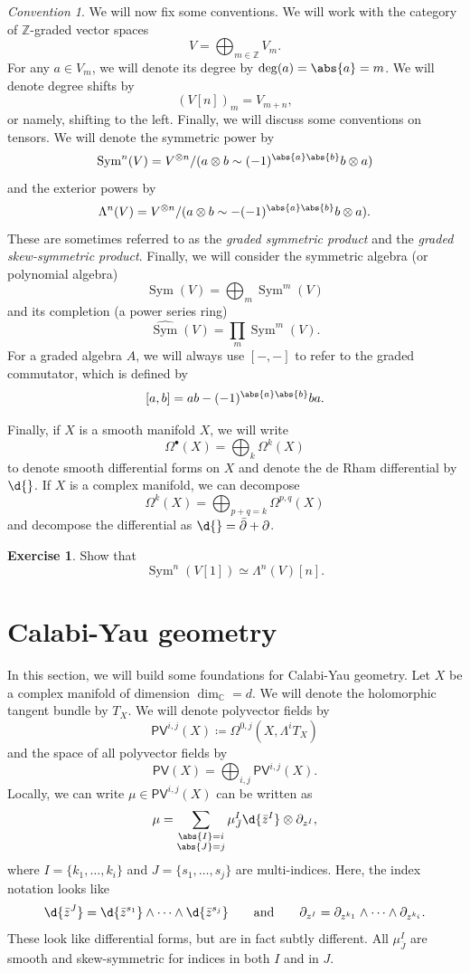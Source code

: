 \documentclass[article,10pt,oneside,oldfontcommands]{memoir}
\theoremstyle{definition}
\newtheorem{exer}[thm]{Exercise}
\theoremstyle{remark}
\newtheorem{conv}[thm]{Convention}
\theoremstyle{plain}
\theoremstyle{definition}
\theoremstyle{remark}
\newcommand{\C}{\mathbb{C}}
\newcommand{\Z}{\mathbb{Z}}
\newcommand{\on}[1]{\operatorname{#1}}
\newcommand{\ms}[1]{\mathsf{#1}}
\newcommand{\wh}[1]{\widehat{#1}}
\newcommand{\1}{\mathbf{1}}
\newcommand{\2}{\mathbf{2}}
\newcommand{\3}{\mathbf{3}}
\DeclareMathOperator{\Sym}{Sym}
\begin{document}
\begin{conv}
    We will now fix some conventions. We will work with the category of \(\Z\)-graded vector spaces
    \[ V = \bigoplus_{m \in \Z} V_m. \]
    For any \(a \in V_m\), we will denote its degree by \(\deg(a) = \abs{a} = m\). We will denote degree shifts by
    \[ (V[n])_m = V_{m+n}, \]
    or namely, shifting to the left. Finally, we will discuss some conventions on tensors. We will denote the symmetric power by
    \[ \on{Sym}^n(V) = V^{\otimes n} / (a \otimes b \sim (-1)^{\abs{a} \abs{b}} b \otimes a) \]
    and the exterior powers by
    \[ \Lambda^n (V) = V^{\otimes n} / (a \otimes b \sim -(-1)^{\abs{a} \abs{b}} b \otimes a). \]
    These are sometimes referred to as the \textit{graded symmetric product} and the \textit{graded skew-symmetric product}. Finally, we will consider the symmetric algebra (or polynomial algebra)
    \[ \Sym(V) = \bigoplus_m \Sym^m(V) \]
    and its completion (a power series ring)
    \[ \wh{\Sym}(V) = \prod_{m} \Sym^m(V). \]
    For a graded algebra \(A\), we will always use \([-,-]\) to refer to the graded commutator, which is defined by
    \[ [a,b] = ab - (-1)^{\abs{a} \abs{b}} ba. \]
    
    Finally, if \(X\) is a smooth manifold \(X\), we will write
    \[ \Omega^{\bullet}(X) = \bigoplus_k \Omega^k (X) \]
    to denote smooth differential forms on \(X\) and denote the de Rham differential by \(\d{}\). If \(X\) is a complex manifold, we can decompose
    \[ \Omega^k(X) = \bigoplus_{p+q=k} \Omega^{p,q}(X) \]
    and decompose the differential as \(\d{} = \bar{\partial} + \partial\).
\end{conv}

\begin{exer}
    Show that
    \[ \on{Sym}^n(V[1]) \simeq \Lambda^n(V)[n]. \]
\end{exer}

\chapter{Calabi-Yau geometry}%
\label{cha:Calabi-Yau geometry}

In this section, we will build some foundations for Calabi-Yau geometry. Let \(X\) be a complex manifold of dimension \(\dim_{\C} = d\). We will denote the holomorphic tangent bundle by \(T_X\). We will denote polyvector fields by
\[ \ms{PV}^{i,j}(X) \coloneqq \Omega^{0, j}(X, \Lambda^i T_X) \]
and the space of all polyvector fields by
\[ \ms{PV}(X) = \bigoplus_{i,j} \ms{PV}^{i,j}(X). \]
Locally, we can write \(\mu \in \ms{PV}^{i,j}(X)\) can be written as
\[ \mu = \sum_{\substack{\abs{I} = i \\ \abs{J} = j}} \mu^I_{\bar{J}} \d{\bar{z}^I} \otimes \partial_{z^I}, \]
where \(I = \{k_1, \ldots, k_i \}\) and \(J = \{ s_1, \ldots, s_j\}\) are multi-indices. Here, the index notation looks like
\[ \d{\bar{z}^J} = \d{\bar{z}^{s_1}} \wedge \cdots \wedge \d{\bar{z}^{s_j}} \qquad \text{and} \qquad \partial_{z^I} = \partial_{z^{k_1}} \wedge \cdots \wedge \partial_{z^{k_i}}. \]
These look like differential forms, but are in fact subtly different. All \(\mu^I_{\bar{J}}\) are smooth and skew-symmetric for indices in both \(I\) and in \(J\).
\end{document}
